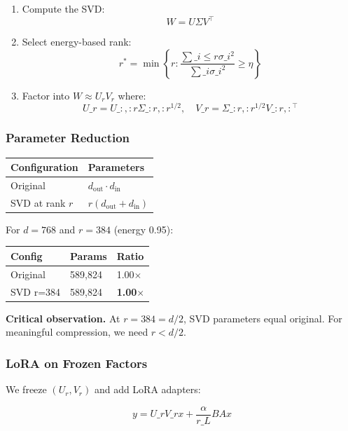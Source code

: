 \begin{enumerate}
\item Compute the SVD:
  \[
W = U \Sigma V^\top
\]
\item Select energy-based rank:
  \[
r^* = \min \left\{ r : \frac{\sum\_{i \leq r} \sigma\_i^2}{\sum\_i \sigma\_i^2} \geq \eta \right\}
\]
\item Factor into $W \approx U_r V_r$ where:
  \[
U\_r = U\_{:, :r} \Sigma\_{:r, :r}^{1/2}, \quad
  V\_r = \Sigma\_{:r, :r}^{1/2} V\_{:r, :}^\top
\]

\end{enumerate}
\subsubsection{Parameter Reduction}

\begin{table}[H]
\centering
\small
\begin{tabular}{ll}
\toprule
\textbf{Configuration} & \textbf{Parameters} \\
\midrule
Original & $d_\text{out} \cdot d_\text{in}$ \\
SVD at rank $r$ & $r(d_\text{out} + d_\text{in})$ \\
\bottomrule
\end{tabular}
\end{table}

For $d = 768$ and $r = 384$ (energy 0.95):

\begin{table}[H]
\centering
\small
\begin{tabular}{lll}
\toprule
\textbf{Config} & \textbf{Params} & \textbf{Ratio} \\
\midrule
Original & 589,824 & 1.00$\times$ \\
SVD r=384 & 589,824 & \textbf{1.00$\times$} \\
\bottomrule
\end{tabular}
\end{table}

\textbf{Critical observation.} At $r = 384 = d/2$, SVD parameters equal original. 
For meaningful compression, we need $r < d/2$.

\subsubsection{LoRA on Frozen Factors}

We freeze $(U_r, V_r)$ and add LoRA adapters:

\[
y = U\_r V\_r x + \frac{\alpha}{r\_L} B A x
\]

